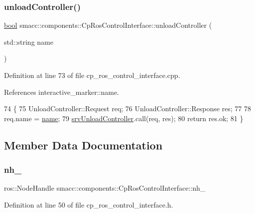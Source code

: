 \subsubsection{\texorpdfstring{unload\+Controller()}{unloadController()}}
{\footnotesize\ttfamily \hyperlink{classbool}{bool} smacc\+::components\+::\+Cp\+Ros\+Control\+Interface\+::unload\+Controller (\begin{DoxyParamCaption}\item[{std\+::string}]{name }\end{DoxyParamCaption})}



Definition at line 73 of file cp\+\_\+ros\+\_\+control\+\_\+interface.\+cpp.



References interactive\+\_\+marker\+::name.


\begin{DoxyCode}
74 \{
75     UnloadController::Request req;
76     UnloadController::Response res;
77 
78     req.name = \hyperlink{namespaceinteractive__marker_a447655961b3d3ca3c5a2a9d3d769436d}{name};
79     \hyperlink{classsmacc_1_1components_1_1CpRosControlInterface_a0515a2a86bfcd0fdec08fabd3070723c}{srvUnloadController}.call(req, res);
80     \textcolor{keywordflow}{return} res.ok;
81 \}
\end{DoxyCode}


\subsection{Member Data Documentation}
\mbox{\label{classsmacc_1_1components_1_1CpRosControlInterface_a58b15bd11d13cb02813232c6e50adbd2}} 
\subsubsection{\texorpdfstring{nh\+\_\+}{nh\_}}
{\footnotesize\ttfamily ros\+::\+Node\+Handle smacc\+::components\+::\+Cp\+Ros\+Control\+Interface\+::nh\+\_\+\hspace{0.3cm}{\ttfamily [private]}}



Definition at line 50 of file cp\+\_\+ros\+\_\+control\+\_\+interface.\+h.

